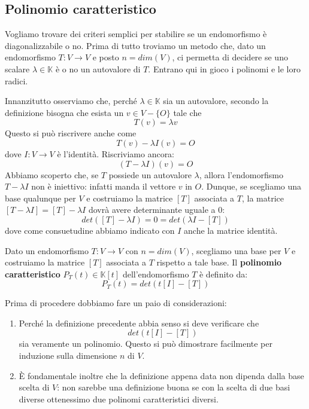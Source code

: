 
\subsection{Polinomio caratteristico}
Vogliamo trovare dei criteri semplici per stabilire se un endomorfismo
\`e diagonalizzabile o no. Prima di tutto troviamo un metodo che, dato un
endomorfismo $T : V \to V$ e posto $n = dim(V)$, ci permetta di decidere se
uno scalare $\lambda \in \mathbb{K}$ \`e o no un autovalore di $T$. Entrano
qui in gioco i polinomi e le loro radici.

Innanzitutto osserviamo che, perch\'e $\lambda \in \mathbb{K}$ sia un
autovalore, secondo la definizione bisogna che esista un $v \in V - \{O\}$
tale che
\begin{equation*}
	T(v) = \lambda v
\end{equation*}
Questo si pu\`o riscrivere anche come
\begin{equation*}
	T(v) - \lambda I(v) = O
\end{equation*}
dove $I : V \to V$ \`e l'identit\`a. Riscriviamo ancora:
\begin{equation*}
	(T - \lambda I)(v) = O
\end{equation*}
Abbiamo scoperto che, se $T$ possiede un autovalore $\lambda$, allora
l'endomorfismo $T - \lambda I$ non \`e iniettivo: infatti manda il vettore
$v$ in $O$. Dunque, se scegliamo una base qualunque per $V$ e costruiamo la
matrice $[T]$ associata a $T$, la matrice $[T - \lambda I] = [T] - \lambda I$
dovr\`a avere determinante uguale a 0:
\begin{equation*}
	det([T] - \lambda I) = 0 = det(\lambda I - [T])
\end{equation*}
dove come consuetudine abbiamo indicato con $I$ anche la matrice identit\`a.

\begin{defn}
	Dato un endomorfismo $T : V \to V$ con $n = dim(V)$, scegliamo una base
	per $V$ e costruiamo la matrice $[T]$ associata a $T$ rispetto a tale
	base. Il \textbf{polinomio caratteristico} $P_T(t) \in \mathbb{K}[t]$
	dell'endomorfismo $T$ \`e definito da:
	\begin{equation*}
		P_T(t) = det(t[I] - [T])
	\end{equation*}
\end{defn}

\begin{observation}
	Prima di procedere dobbiamo fare un paio di considerazioni:
	\begin{enumerate}
		\item Perch\'e la definizione precedente abbia senso si deve verificare
		      che \[det(t[I] - [T])\] sia veramente un polinomio. Questo si pu\`o
		      dimostrare facilmente per induzione sulla dimensione
		      $n$ di $V$.
		\item \`E fondamentale inoltre che la definizione appena data non dipenda
		      dalla base scelta di $V$: non sarebbe una definizione buona se con
		      la scelta di due basi diverse ottenessimo due polinomi
		      caratteristici diversi.
	\end{enumerate}
\end{observation}

